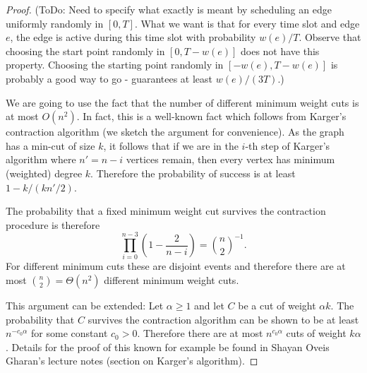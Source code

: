 \documentclass[runningheads]{llncs}
\numberwithin{equation}{section}
\begin{document}
\begin{proof}
(ToDo: Need to specify what exactly is meant by scheduling an edge uniformly randomly in $[0,T]$. What we want is that for every time slot and edge $e$, the edge is active during this time slot with probability $w(e)/T$. Observe that choosing the start point randomly in $[0, T-w(e)]$ does not have this property. Choosing the starting point randomly in $[-w(e), T-w(e)]$ is probably a good way to go - guarantees at least $w(e)/(3T)$.)

We are going to use the fact that the number of different minimum weight cuts is at most $O(n^2)$. In fact, this  is a well-known fact which follows from Karger's contraction algorithm (we sketch the argument for convenience).
As the graph has a min-cut of size $k$, it follows that if we are in the $i$-th step of Karger's algorithm where $n' = n-i$ vertices remain, then every vertex has minimum (weighted) degree $k$. Therefore the probability of success is at least $1 - k/(kn'/2)$.

The probability that a fixed minimum weight cut survives the contraction procedure is therefore
\[\prod_{i=0}^{n-3} (1 - \frac{2}{n-i}) = {n \choose 2}^{-1}.
\]
For different minimum cuts these are disjoint events and therefore there are at most ${n \choose 2} = \Theta(n^2)$ different minimum weight cuts.

This argument can be extended: Let $\alpha \geq 1$ and let $C$ be a cut of weight $\alpha k$. The probability that $C$ survives the contraction algorithm can be shown to be at least $n^{-c_0\alpha}$ for some constant $c_0 > 0$. Therefore there are at most $n^{c_0\alpha}$ cuts of weight $k\alpha$. Details for the proof of this known for example be found in Shayan Oveis Gharan's lecture notes (section on Karger's algorithm).


\end{proof}
\end{document}
